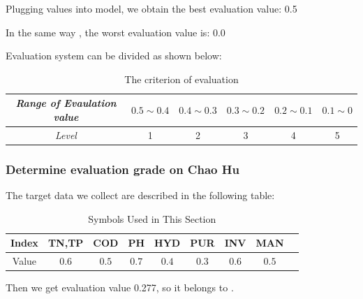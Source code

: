 \documentclass[12pt,a4paper]{article}
\begin{document}
Plugging values into model, we obtain the best evaluation value: 0.5\par
In the same way , the worst evaluation value is: 0.0\par
Evaluation system can be divided as shown below:

\begin{table}[H] \renewcommand\arraystretch{1.5}
    \begin{center}
        \begin{footnotesize}
            \begin{tabular}{cccccc}\toprule[1pt]
                \it Range of Evaulation value&$0.5\sim0.4$&$0.4\sim 0.3$&$0.3\sim0.2$&$0.2\sim0.1$&$0.1\sim0$\\\hline
                \it Level&1&2&3&4&5\\\bottomrule[1pt]
            \end{tabular}
        \end{footnotesize}
        \caption{\footnotesize {The criterion of evaluation}}
    \end{center}
\end{table}\par

\subsubsection{Determine evaluation grade on Chao Hu}
The target data we collect are described in the following table:

\begin{table}[H] \renewcommand\arraystretch{1.5}
    \begin{center}
        \caption{\footnotesize {Symbols Used in This Section}}
        \begin{footnotesize}
            \begin{tabular}{ccccccccc}\\\toprule[1pt]
                Index    &TN,TP&COD&PH&HYD&PUR&INV&MAN\\\hline
                Value    &$0.6$&$0.5$&$0.7$&$0.4$&$0.3$&$0.6$&$0.5$&\\\bottomrule[1pt]  
            \end{tabular}%
        \end{footnotesize}
    \end{center}
\end{table}
Then we get evaluation value 0.277, so it belongs to \uppercase\expandafter{}.\par
\end{document}
